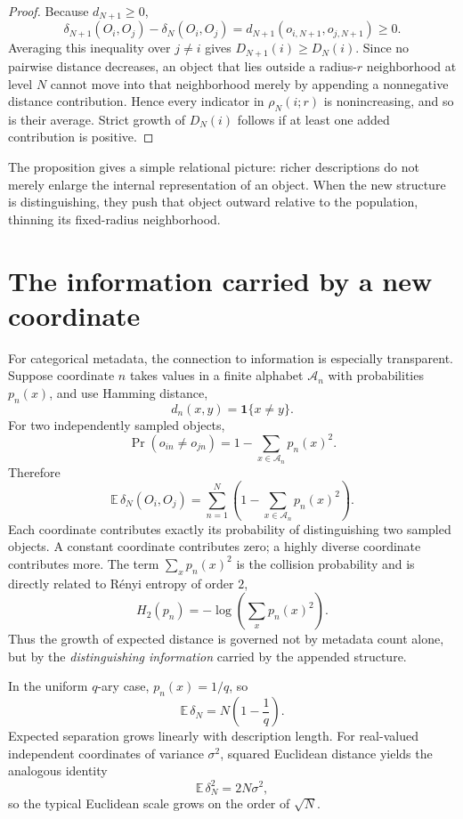 \documentclass[10.5pt]{article}
\begin{document}
\begin{proof}
Because $d_{N+1}\ge 0$,
\[
\delta_{N+1}(O_i,O_j)-\delta_N(O_i,O_j)
=d_{N+1}(o_{i,N+1},o_{j,N+1})\ge 0.
\]
Averaging this inequality over $j\ne i$ gives $D_{N+1}(i)\ge D_N(i)$. Since no pairwise distance decreases, an object that lies outside a radius-$r$ neighborhood at level $N$ cannot move into that neighborhood merely by appending a nonnegative distance contribution. Hence every indicator in $\rho_N(i;r)$ is nonincreasing, and so is their average. Strict growth of $D_N(i)$ follows if at least one added contribution is positive.
\end{proof}

The proposition gives a simple relational picture: richer descriptions do not merely enlarge the internal representation of an object. When the new structure is distinguishing, they push that object outward relative to the population, thinning its fixed-radius neighborhood.

\section*{The information carried by a new coordinate}
For categorical metadata, the connection to information is especially transparent. Suppose coordinate $n$ takes values in a finite alphabet $\mathcal A_n$ with probabilities $p_n(x)$, and use Hamming distance,
\[
d_n(x,y)=\mathbf 1\{x\ne y\}.
\]
For two independently sampled objects,
\[
\Pr(o_{in}\ne o_{jn})
=1-\sum_{x\in\mathcal A_n}p_n(x)^2.
\]
Therefore
\[
\mathbb E\,\delta_N(O_i,O_j)
=\sum_{n=1}^{N}\left(1-\sum_{x\in\mathcal A_n}p_n(x)^2\right).
\]
Each coordinate contributes exactly its probability of distinguishing two sampled objects. A constant coordinate contributes zero; a highly diverse coordinate contributes more. The term $\sum_x p_n(x)^2$ is the collision probability and is directly related to R\'enyi entropy of order $2$,
\[
H_2(p_n)=-\log\!\left(\sum_x p_n(x)^2\right).
\]
Thus the growth of expected distance is governed not by metadata count alone, but by the \emph{distinguishing information} carried by the appended structure.

In the uniform $q$-ary case, $p_n(x)=1/q$, so
\[
\mathbb E\,\delta_N=N\left(1-\frac1q\right).
\]
Expected separation grows linearly with description length. For real-valued independent coordinates of variance $\sigma^2$, squared Euclidean distance yields the analogous identity
\[
\mathbb E\,\delta_N^2=2N\sigma^2,
\]
so the typical Euclidean scale grows on the order of $\sqrt N$.
\end{document}
